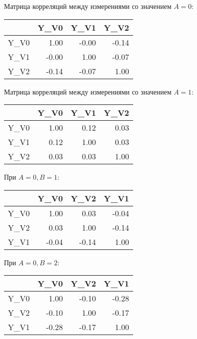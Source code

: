 \documentclass[a4paper,12pt]{article}
\begin{document}
Матрица корреляций между  измерениями со значением $ A = 0 $:

\begin{table}[H]
	\centering
	\begin{tabular}{rrrr}
        \hline
        & Y\_V0 & Y\_V1 & Y\_V2 \\
        \hline
        Y\_V0 & 1.00 & -0.00 & -0.14 \\
        Y\_V1 & -0.00 & 1.00 & -0.07 \\
        Y\_V2 & -0.14 & -0.07 & 1.00 \\
        \hline
    \end{tabular}
\end{table}

Матрица корреляций между измерениями со значением $ A = 1 $:

\begin{table}[H]
	\centering
	\begin{tabular}{rrrr}
        \hline
        & Y\_V0 & Y\_V1 & Y\_V2 \\
        \hline
        Y\_V0 & 1.00 & 0.12 & 0.03 \\
        Y\_V1 & 0.12 & 1.00 & 0.03 \\
        Y\_V2 & 0.03 & 0.03 & 1.00 \\
        \hline
    \end{tabular}
\end{table}

При $ A = 0, B = 1 $:

\begin{table}[H]
	\centering
	\begin{tabular}{rrrr}
        \hline
        & Y\_V0 & Y\_V2 & Y\_V1 \\
        \hline
        Y\_V0 & 1.00 & 0.03 & -0.04 \\
        Y\_V2 & 0.03 & 1.00 & -0.14 \\
        Y\_V1 & -0.04 & -0.14 & 1.00 \\
        \hline
    \end{tabular}
\end{table}

При $ A = 0, B = 2 $:

\begin{table}[H]
	\centering
	\begin{tabular}{rrrr}
        \hline
        & Y\_V0 & Y\_V2 & Y\_V1 \\
        \hline
        Y\_V0 & 1.00 & -0.10 & -0.28 \\
        Y\_V2 & -0.10 & 1.00 & -0.17 \\
        Y\_V1 & -0.28 & -0.17 & 1.00 \\
        \hline
    \end{tabular}
\end{table}
\end{document}

